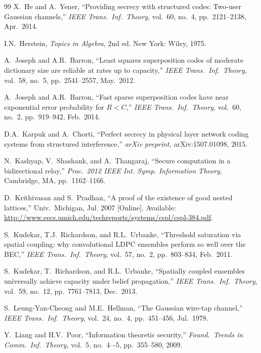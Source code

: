 \documentclass[main.tex]{subfiles}
\begin{document}
\begin{thebibliography}{99}
X.~He and A.~Yener, ``Providing secrecy with structured codes: Two-user Gaussian channels,''
\emph{IEEE Trans.\ Inf.\ Theory}, vol.\ 60, no.\ 4, pp.\ 2121--2138, Apr.\ 2014.

 I.N.\ Herstein, \emph{Topics in Algebra}, 2nd ed. New York: Wiley, 1975.

A.~Joseph and A.R.~Barron, ``Least squares superposition codes of moderate dictionary size are reliable at rates up to capacity,''
\emph{IEEE Trans.\ Inf.\ Theory}, vol.\ 58, no.\ 5, pp.\ 2541--2557, May.\ 2012.

A.~Joseph and A.R.~Barron, ``Fast sparse superposition codes have near exponential error probability for $R<C$,'' 
\emph{IEEE Trans.\ Inf.\ Theory}, vol.\ 60, no.\ 2, pp.\ 919--942, Feb.\ 2014.

D.A.\ Karpuk and A.\ Chorti, ``Perfect secrecy in physical layer network coding systems from structured interference,'' \emph{ arXiv preprint,} arXiv:1507.01098, 2015.

  N.~Kashyap, V.~Shashank, and A.~Thangaraj, ``Secure computation in a bidirectional relay,'' \emph{Proc.\ 2012 IEEE Int. Symp. Information Theory}, Cambridge, MA, pp.\ 1162--1166. 
  

 D.\ Krithivasan and S.\ Pradhan, ``A proof of the existence of good nested lattices,'' 
 Univ.\ Michigan, Jul. 2007 [Online]. Available: \url{http://www.eecs.umich.edu/techreports/systems/cspl/cspl-384.pdf}. 
 
 S.\ Kudekar, T.J.\ Richardson, and R.L.\ Urbanke, ``Threshold saturation via spatial coupling: why convolutional LDPC ensembles perform so well over the BEC,'' \emph{IEEE Trans.\ Inf.\ Theory}, vol.\ 57, no.\ 2, pp.\ 803--834, Feb.\ 2011.
 
 S.\ Kudekar, T.\ Richardson, and R.L.\ Urbanke, ``Spatially coupled ensembles universally achieve capacity under belief propagation,'' \emph{IEEE Trans.\ Inf.\ Theory}, vol.\ 59, no.\ 12, pp.\ 7761--7813, Dec.\ 2013.
 
S.~Leung-Yan-Cheong and M.E.~Hellman, ``The Gaussian wire-tap channel,'' 
 \emph{IEEE Trans.\ Inf.\ Theory}, vol.\ 24, no.\ 4, pp.\ 451--456, Jul.\ 1978.
 
 Y.\ Liang and H.V.\ Poor, ``Information theoretic security,'' \emph{Found.\ Trends in Comm.\ Inf.\ Theory,} vol.\ 5, no.\ 4–-5, pp.\ 355--580, 2009.


\end{thebibliography}
\end{document}
